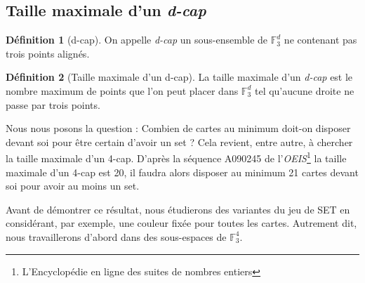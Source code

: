 \documentclass[a4paper,12pt,titlepage]{article}
\theoremstyle{plain}
\theoremstyle{definition}
\newtheorem{defi}{Définition}
\newcommand{\Ftrois}[1]{\mathbb{F}^#1_3}
\begin{document}
\subsection{Taille maximale d'un \emph{d-cap}}
\begin{defi}[d-cap]
  On appelle \emph{d-cap} un sous-ensemble de  $\Ftrois{d}$ ne contenant pas trois points alignés.
\end{defi}
\begin{defi}[Taille maximale d'un d-cap]
  La taille maximale d'un \emph{d-cap} est le nombre maximum de points que l'on peut placer dans $\Ftrois{d}$ tel qu'aucune droite ne passe par trois points.
\end{defi}
Nous nous posons la question : Combien de cartes au minimum doit-on disposer devant soi pour être certain d'avoir un set ?
Cela revient, entre autre, à chercher la taille maximale d'un 4-cap. D'après la séquence A090245 de l'\emph{OEIS}\footnote{L'Encyclopédie en ligne des suites de nombres entiers} la taille maximale d'un 4-cap est 20, il faudra alors disposer au minimum 21 cartes devant soi pour avoir au moins un set.

Avant de démontrer ce résultat, nous étudierons des variantes du jeu de SET en considérant, par exemple, une couleur fixée pour toutes les cartes. Autrement dit, nous travaillerons d'abord dans des sous-espaces de  $\Ftrois{4}$.
\end{document}
